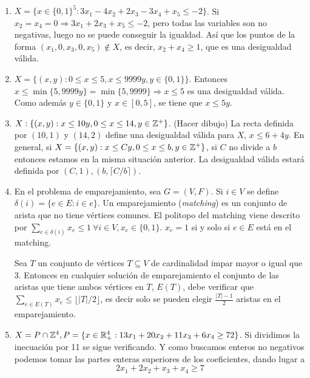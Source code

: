 \documentclass[MIOP.tex]{subfiles}
\begin{document}
\begin{ejs}\
\begin{enumerate}
\item $X=\{x\in\{0,1\}^5: 3x_1-4x_2+2x_3-3x_4+x_5\leq-2\}$. Si $x_2=x_4=0\Rightarrow 3x_1+2x_3+x_5\leq -2$, pero todas las variables son no negativas, luego no se puede conseguir la igualdad. Así que los puntos de la forma $(x_1,0,x_3,0,x_5)\notin X$, es decir, $x_2+x_4\geq 1$, que es una desigualdad válida.
\item $X=\{(x,y):0\leq x\leq 5, x\leq 9999y,y\in\{0,1\}\}$. Entonces $x\leq\min\{5,9999y\}=\min\{5,9999\}\Rightarrow x\leq 5$ es una desigualdad válida. Como además $y\in\{0,1\}$ y $x\in[0,5]$, se tiene que $x\leq 5y$.
\item $X:\{(x,y): x\leq 10y, 0\leq x\leq 14, y\in\mathbb{Z}^+\}$. (Hacer dibujo)
La recta definida por $(10,1)$ y $(14,2)$ define una desigualdad válida para $X$, $x\leq 6+4y$. En general, si $X=\{(x,y):x\leq Cy, 0\leq x\leq b,y\in\mathbb{Z}^+\}$, si $C$ no divide a $b$ entonces estamos en la misma situación anterior. La desigualdad válida estará definida por $(C,1),(b,\lceil C/b\rceil)$.
\item En el problema de emparejamiento, sea $G=(V,F)$. Si $i\in V$ se define $\delta(i)=\{e\in E:i\in e\}$. Un emparejamiento (\emph{matching}) es un conjunto de arista que no tiene vértices comunes. El politopo del matching viene descrito por $\sum_{e\in\delta(i)}x_e\leq 1\ \forall i\in V, x_e\in\{0,1\}$. $x_e=1$ si y solo si $e\in E$ está en el matching.  

Sea $T$ un conjunto de vértices $T\subseteq V$ de cardinalidad impar mayor o igual que 3. Entonces en cualquier solución de emparejamiento el conjunto de las aristas que tiene ambos vértices en $T$, $E(T)$, debe verificar que $\sum_{e\in E(T)}x_e\leq\lfloor |T|/2\rfloor$, es decir solo se pueden elegir $\frac{|T|-1}{2}$ aristas en el emparejamiento.
\item $X=P\cap\mathbb{Z}^4, P=\{x\in\mathbb{R}^4_+:13x_1+20x_2+11x_3+6x_4\geq 72\}$. Si dividimos la inecuación por 11 se sigue verificando. Y como buscamos enteros no negativos podemos tomar las partes enteras superiores de los coeficientes, dando lugar a 
$$2x_1+2x_2+x_3+x_4\geq 7$$
\end{enumerate}
\end{ejs}
\end{document}
